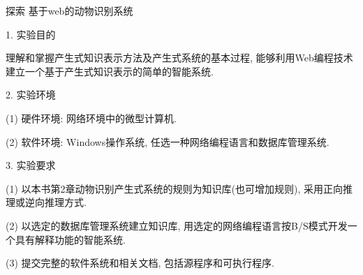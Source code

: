 \begin{custom}[explorecolor]{探索}
基于web的动物识别系统

    1. 实验目的

    理解和掌握产生式知识表示方法及产生式系统的基本过程, 能够利用Web编程技术建立一个基于产生式知识表示的简单的智能系统.

    2. 实验环境

    (1) 硬件环境: 网络环境中的微型计算机.

    (2) 软件环境: Windows操作系统, 任选一种网络编程语言和数据库管理系统.

    3. 实验要求

    (1) 以本书第2章动物识别产生式系统的规则为知识库(也可增加规则), 采用正向推理或逆向推理方式.

    (2) 以选定的数据库管理系统建立知识库, 用选定的网络编程语言按B/S模式开发一个具有解释功能的智能系统.

    (3) 提交完整的软件系统和相关文档, 包括源程序和可执行程序.
\end{custom}
